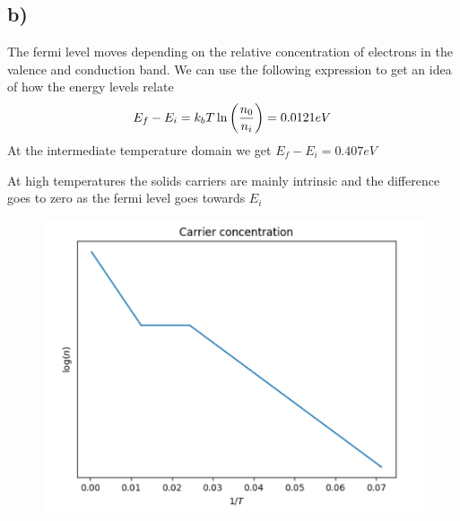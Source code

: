 \documentclass{article}
\begin{document}
\subsection*{b)}
The fermi level moves depending on the relative concentration of electrons in the valence and conduction band.
We can use the following expression to get an idea of how the energy levels relate
\begin{equation*}
	E_f - E_i = k_bT\ln\qty(\frac{n_0}{n_i}) = 0.0121eV
\end{equation*}
At the intermediate temperature domain we get $E_f-E_i = 0.407eV$

At high temperatures the solids carriers are mainly intrinsic and the difference goes to zero as the fermi level goes towards $E_i$

\begin{figure}
	\includegraphics[width = 0.7\linewidth]{concentration.png}
	\centering
\end{figure}
\end{document}

